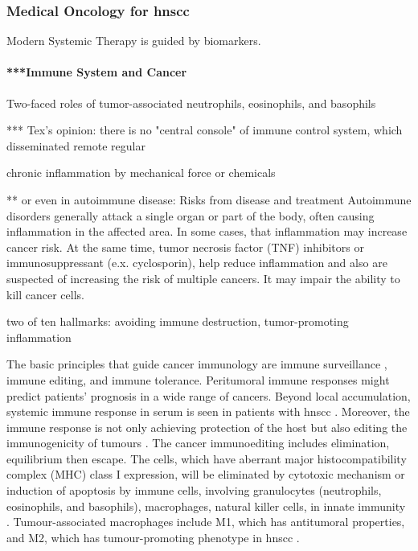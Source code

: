 \documentclass[12pt, a4paper]{article}
\begin{document}


\subsubsection{Medical Oncology for \acrshort{hnscc}}
Modern Systemic Therapy is guided by biomarkers.

\paragraph{***Immune System and Cancer}
Two-faced roles of tumor-associated neutrophils, eosinophils, and basophils

*** Tex's opinion: there is no "central console" of immune control system, which disseminated remote regular %

chronic inflammation by mechanical force or chemicals

** or even in autoimmune disease:
Risks from disease and treatment
Autoimmune disorders generally attack a single organ or part of the body, often causing inflammation in the affected area. In some cases, that inflammation may increase cancer risk. 
At the same time, tumor necrosis factor (TNF) inhibitors or immunosuppressant (e.x. cyclosporin), help reduce inflammation and also are suspected of increasing the risk of multiple cancers. It may impair the ability to kill cancer cells.

two of ten hallmarks: avoiding immune destruction, tumor-promoting inflammation \citep{Ohman2015}



The basic principles that guide cancer immunology are immune surveillance \citep{BURNET1957, Shankaran2001}, immune editing, and immune tolerance.
Peritumoral immune responses might predict patients’ prognosis in a wide range of cancers. Beyond local accumulation, systemic immune response in serum is seen in patients with \acrshort{hnscc} \citep{Lee2010a}.
Moreover, the immune response is not only achieving protection of the host but also editing the immunogenicity of tumours \citep{Dunn2002}.
The cancer immunoediting includes elimination, equilibrium then escape.
The cells, which have aberrant major histocompatibility complex (MHC) class I expression, will be eliminated by cytotoxic mechanism or induction of apoptosis by immune cells, involving granulocytes (neutrophils, eosinophils, and basophils), macrophages, natural
killer cells, in innate immunity \citep{Tallerico2013}.
Tumour-associated macrophages include  M1, which has antitumoral properties, and M2, which has tumour-promoting phenotype in \acrshort{hnscc} \citep{Kumar2019}.
\end{document}
